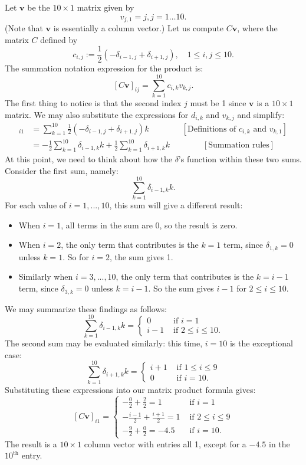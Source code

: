 \begin{example}{}
Let $\mathbf{v}$ be the $10 \times 1$ matrix given by  
\[
v_{j,1} = j, j=1 \ldots 10.
\]
(Note that $\mathbf{v}$ is essentially a column vector.) Let us compute $C\mathbf{v}$, where 
the matrix $C$ defined by 
\[
  c_{i,j} := \frac{1}{2} (-\delta_{i-1,j} + \delta_{i+1,j}), \quad 1 \le i,j \le 10.
\]
The summation notation expression for the product is:
\[
[C\mathbf{v}]_{ij} = \sum_{k=1}^{10} c_{i,k} v_{k,j}.
\]
The first thing to notice is that the second index $j$ must be 1 since $\mathbf{v}$ is a $10 \times 1$ matrix. We may also substitute the expressions for $d_{i,k}$ and  $v_{k,j}$ and simplify:
\begin{align*}
[C\mathbf{v}]_{i1} &= \sum_{k=1}^{10} \frac{1}{2} (-\delta_{i-1,j} + \delta_{i+1,j}) k \qquad \qquad [\text{Definitions of } c_{i,k} \text{ and } v_{k,1}]\\ 
&= -\frac{1}{2}\sum_{k=1}^{10}  \delta_{i-1,k}k + \frac{1}{2}\sum_{k=1}^{10}  \delta_{i+1,k}k \qquad \qquad [\text{Summation rules}]
\end{align*}
At this point, we need to think about how the $\delta$'s function within these two sums. Consider the first sum, namely: 
\[ \sum_{k=1}^{10}  \delta_{i-1,k}k. \] 
For each value of $i=1,...,10$, this sum will give a different result:
\begin{itemize}
\item
When $i=1$, all terms in the sum are 0, so the result is zero.
\item
When $i=2$, the only term that contributes is the $k=1$ term, since  $\delta_{1,k} = 0$ unless $k=1$. So for $i=2$, the sum gives 1.
\item
Similarly when $i=3,...,10$, the only term that contributes is the $k=i-1$ term, since  $\delta_{3,k} = 0$ unless $k=i-1$. So the sum gives $i-1$ for $2\le i \le 10$.
\end{itemize}
We may summarize these findings as follows:
\[
\sum_{k=1}^{10}  \delta_{i-1,k}k = \begin{cases} 0 & \text{ if } i=1 \\ i-1 & \text{ if } 2 \le i \le 10. \end{cases}
\]
The second sum may be evaluated similarly: this time, $i=10$ is the exceptional case:
\[
\sum_{k=1}^{10}  \delta_{i+1,k}k = \begin{cases}  i+1 & \text{ if } 1 \le i \le 9 \\ 0 & \text{ if } i=10 . \end{cases}
\]
Substituting these expressions into our matrix product formula gives:
\[
[C\mathbf{v}]_{i1} = \begin{cases}  -\frac{0}{2} + \frac{2}{2} = 1 & \text{ if } i=1\\
							-\frac{i-1}{2} + \frac{i+1}{2} = 1 & \text{ if } 2 \le i \le 9\\
							-\frac{9}{2} + \frac{0}{2} = -4.5 & \text{ if } i=10.
                                  \end{cases}
\]
The result is a $10 \times 1$ column vector with entries all 1, except for a $-4.5$  in the $10^{\text{th}}$ entry.
\end{example}


